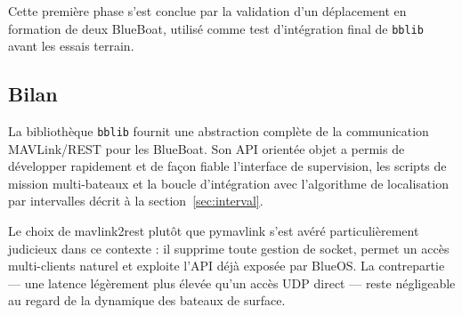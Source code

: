 Cette première phase s'est conclue par la validation d'un déplacement en formation de deux BlueBoat, utilisé comme test d'intégration final de \texttt{bblib} avant les essais terrain.

\subsection{Bilan}
\label{sec:bblib:bilan}

La bibliothèque \texttt{bblib} fournit une abstraction complète de la communication MAVLink/REST pour les BlueBoat. Son API orientée objet a permis de développer rapidement et de façon fiable l'interface de supervision, les scripts de mission multi-bateaux et la boucle d'intégration avec l'algorithme de localisation par intervalles décrit à la section~\ref{sec:interval}.

Le choix de mavlink2rest plutôt que pymavlink s'est avéré particulièrement judicieux dans ce contexte : il supprime toute gestion de socket, permet un accès multi-clients naturel et exploite l'API déjà exposée par BlueOS. La contrepartie — une latence légèrement plus élevée qu'un accès UDP direct — reste négligeable au regard de la dynamique des bateaux de surface.

\setlength{\parskip}{\bblibOldParskip}
\setlength{\parindent}{\bblibOldParindent}
\setlength{\intextsep}{\bblibOldIntextsep}
\setlength{\textfloatsep}{\bblibOldTextfloatsep}
\setlength{\abovecaptionskip}{\bblibOldAbovecaptionskip}
\setlength{\belowcaptionskip}{\bblibOldBelowcaptionskip}
\setlength{\abovedisplayskip}{\bblibOldAbovedisplayskip}
\setlength{\belowdisplayskip}{\bblibOldBelowdisplayskip}
\setlength{\abovedisplayshortskip}{\bblibOldAbovedisplayshortskip}
\setlength{\belowdisplayshortskip}{\bblibOldBelowdisplayshortskip}

